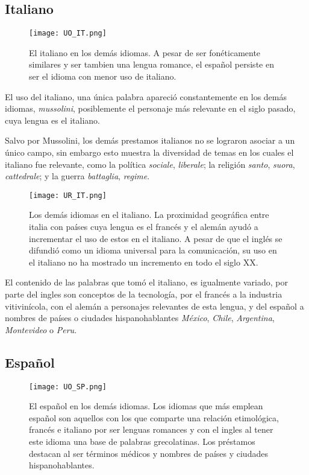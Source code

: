 

\subsection{Italiano} %

\begin{figure}[h!]
	\centering
	\texttt{[image: UO\_IT.png]}
	\caption{El italiano en los demás idiomas. A pesar de ser fonéticamente similares y ser tambien una lengua romance,  el español persiste en ser el idioma con menor uso de italiano.}
	\label{fig.UO_IT}
\end{figure}
		
		
El uso del italiano, una única palabra apareció constantemente en los demás idiomas, \textit{mussolini}, posiblemente el personaje más relevante en el siglo pasado, cuya lengua es el italiano.  

Salvo por Mussolini, los demás prestamos italianos no se lograron asociar a un único campo, sin embargo esto muestra la diversidad de temas en los cuales el italiano fue relevante, como la política \textit{sociale}, \textit{liberale}; la religión \textit{santo}, \textit{suora}, \textit{cattedrale}; y la guerra \textit{battaglia}, \textit{regime}.


\begin{figure}[h!]
	\centering
	\texttt{[image: UR\_IT.png]}
	\label{fig.ST_b_IT}
	\caption{Los demás idiomas en el italiano. La proximidad geográfica  entre italia con países cuya lengua es el francés y el alemán ayudó a incrementar el uso de estos en el italiano. A pesar de que el inglés se difundió como un idioma universal para la comunicación, su uso en el italiano no ha mostrado un incremento en todo el siglo XX. }
	\label{fig.UR_IT}
\end{figure}

El contenido de las palabras que tomó el italiano, es igualmente variado, por parte del ingles son conceptos de la tecnología, por el francés a la industria vitivinícola, con el alemán a personajes relevantes de esta lengua, y del español a nombres de países o ciudades hispanohablantes \textit{México}, \textit{Chile}, \textit{Argentina}, \textit{Montevideo} o \textit{Peru}. 



\subsection{Español} %

\begin{figure}[h!] %
	\centering
	\texttt{[image: UO\_SP.png]}
	\caption{El español en los demás idiomas. Los idiomas que más emplean español son aquellos con los que comparte una relación etimológica, francés e italiano por ser lenguas romances y con el ingles al tener este idioma una base de palabras grecolatinas.  Los préstamos destacan al ser términos médicos y nombres de países y ciudades hispanohablantes.}
	\label{fig.UO_SP}
	
\end{figure}

